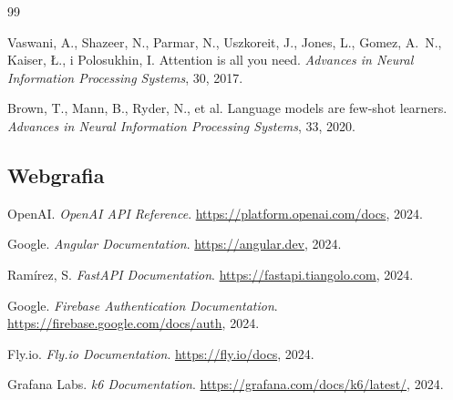 \documentclass[12pt,a4paper]{article}
\begin{document}

\begin{thebibliography}{99}

Vaswani, A., Shazeer, N., Parmar, N., Uszkoreit, J., Jones, L., Gomez, A.~N., Kaiser, \L{}., i Polosukhin, I.
\newblock Attention is all you need.
\newblock \textit{Advances in Neural Information Processing Systems}, 30, 2017.

Brown, T., Mann, B., Ryder, N., et al.
\newblock Language models are few-shot learners.
\newblock \textit{Advances in Neural Information Processing Systems}, 33, 2020.

\subsection*{Webgrafia}

OpenAI.
\newblock \textit{OpenAI API Reference}.
\newblock \url{https://platform.openai.com/docs}, 2024.

Google.
\newblock \textit{Angular Documentation}.
\newblock \url{https://angular.dev}, 2024.

Ramírez, S.
\newblock \textit{FastAPI Documentation}.
\newblock \url{https://fastapi.tiangolo.com}, 2024.

Google.
\newblock \textit{Firebase Authentication Documentation}.
\newblock \url{https://firebase.google.com/docs/auth}, 2024.

Fly.io.
\newblock \textit{Fly.io Documentation}.
\newblock \url{https://fly.io/docs}, 2024.

Grafana Labs.
\newblock \textit{k6 Documentation}.
\newblock \url{https://grafana.com/docs/k6/latest/}, 2024.

\end{thebibliography}
\end{document}
